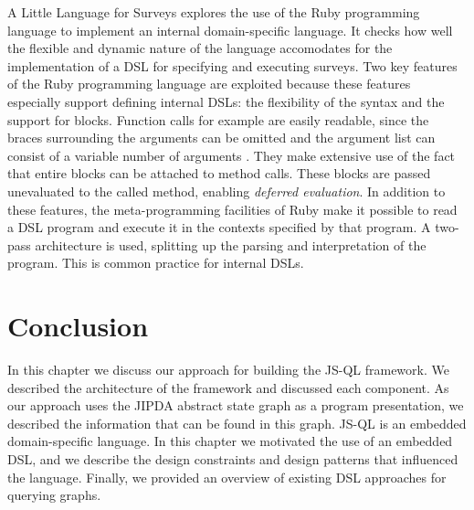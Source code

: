 A Little Language for Surveys \cite{RubyDSL} explores the use of the Ruby programming language to implement an internal domain-specific language. It checks how well the flexible and dynamic nature of the language accomodates for the implementation of a DSL for specifying and executing surveys. Two key features of the Ruby programming language are exploited because these features especially support defining internal DSLs: the flexibility of the syntax and the support for blocks. Function calls for example are easily readable, since the braces surrounding the arguments can be omitted and the argument list can consist of a variable number of arguments . They make extensive use of the fact that entire blocks can be attached to method calls. These blocks are passed unevaluated to the called method, enabling \textit{deferred evaluation}. In addition to these features, the meta-programming facilities of Ruby make it possible to read a DSL program and execute it in the contexts specified by that program. A two-pass architecture is used, splitting up the parsing and interpretation of the program. This is common practice for internal DSLs.


\section{Conclusion}
In this chapter we discuss our approach for building the JS-QL framework. We described the architecture of the framework and discussed each component. As our approach uses the JIPDA abstract state graph as a program presentation, we described the information that can be found in this graph. JS-QL is an embedded domain-specific language. In this chapter we motivated the use of an embedded DSL, and we describe the design constraints and design patterns that influenced the language. Finally, we provided an overview of existing DSL approaches for querying graphs.

